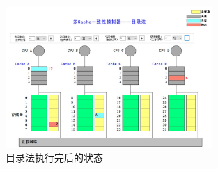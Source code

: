 \documentclass[UTF8]{article}
\begin{document}
    \begin{figure}[H]
        \centering
        \includegraphics[width=0.7\textwidth]{./fig/directory/end.jpg}
        \caption{目录法执行完后的状态}
    \end{figure}
\end{document}

